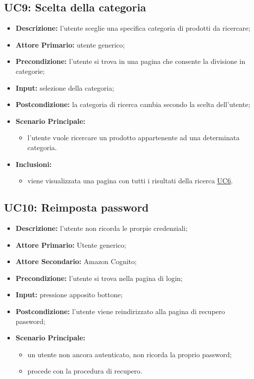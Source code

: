         \subsection{UC9: Scelta della categoria}
        \label{sec:UC9}
        \begin{itemize}
            \item \textbf{Descrizione:} l'utente sceglie una specifica categoria di prodotti da ricercare;
            \item \textbf{Attore Primario:} utente generico;
            \item \textbf{Precondizione:} l'utente si trova in una pagina che consente la divisione in categorie;
            \item \textbf{Input:} selezione della categoria;
            \item \textbf{Postcondizione:} la categoria di ricerca cambia secondo la scelta dell'utente;
            \item \textbf{Scenario Principale:}
            \begin{itemize}
                \item l'utente vuole ricercare un prodotto appartenente ad una determinata categoria.
            \end{itemize} 
            \item \textbf{Inclusioni:}
            \begin{itemize}
                \item viene visualizzata una pagina con tutti i risultati della ricerca \hyperref[sec:UC6]{\underline{UC6}}.
            \end{itemize}
        \end{itemize}
        \subsection{UC10: Reimposta password}
        \label{sec:UC10}
        \begin{itemize}
            \item \textbf{Descrizione:} l'utente non ricorda le prorpie credenziali;
            \item \textbf{Attore Primario:} Utente generico;
            \item \textbf{Attore Secondario:} Amazon Cognito;
            \item \textbf{Precondizione:} l'utente si trova nella pagina di login;
            \item \textbf{Input:} pressione apposito bottone;
            \item \textbf{Postcondizione:} l'utente viene reindirizzato alla pagina di recupero password;
            \item \textbf{Scenario Principale:}
            \begin{itemize}
                \item un utente non ancora autenticato, non ricorda la proprio password;
                \item procede con la procedura di recupero.
            \end{itemize}
        \end{itemize}
